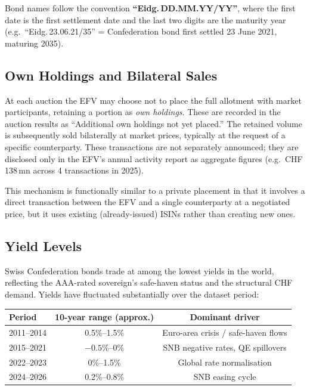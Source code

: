 \documentclass[12pt,a4paper]{article}
\begin{document}
Bond names follow the convention \textbf{``Eidg.\,DD.MM.YY/YY''}, where the
first date is the first settlement date and the last two digits are the
maturity year (e.g.\ ``Eidg.\,23.06.21/35'' = Confederation bond first
settled 23 June 2021, maturing 2035).

\subsection{Own Holdings and Bilateral Sales}
\label{sec:own}

At each auction the EFV may choose not to place the full allotment with market
participants, retaining a portion as \emph{own holdings}.  These are recorded
in the auction results as ``Additional own holdings not yet placed.''  The
retained volume is subsequently sold bilaterally at market prices, typically
at the request of a specific counterparty.  These transactions are not
separately announced; they are disclosed only in the EFV's annual activity
report as aggregate figures (e.g.\ CHF\,138\,mn across 4 transactions in 2025).

This mechanism is functionally similar to a private placement in that it
involves a direct transaction between the EFV and a single counterparty at
a negotiated price, but it uses existing (already-issued) ISINs rather than
creating new ones.

\subsection{Yield Levels}

Swiss Confederation bonds trade at among the lowest yields in the world,
reflecting the AAA-rated sovereign's safe-haven status and the structural
CHF demand.  Yields have fluctuated substantially over the dataset period:

\begin{center}
\begin{tabular}{lcc}
  \toprule
  Period & 10-year range (approx.) & Dominant driver \\
  \midrule
  2011--2014 & 0.5\%--1.5\% & Euro-area crisis / safe-haven flows \\
  2015--2021 & $-0.5$\%--0\%  & SNB negative rates, QE spillovers \\
  2022--2023 & 0\%--1.5\%   & Global rate normalisation \\
  2024--2026 & 0.2\%--0.8\% & SNB easing cycle \\
  \bottomrule
\end{tabular}
\end{center}
\end{document}

